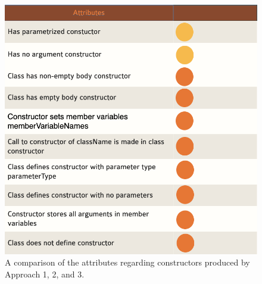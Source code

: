 \documentclass[12pt]{article}
\begin{document}
\begin{figure}
\begin{minipage}{7.5 cm}
\includegraphics[width=\linewidth]{attributeConstructors.png}
\caption{A comparison of the attributes regarding constructors produced by Approach 1, 2, and 3.}
\label{fig:attrConstructor}
\end{minipage}
\end{figure}

\end{document}
